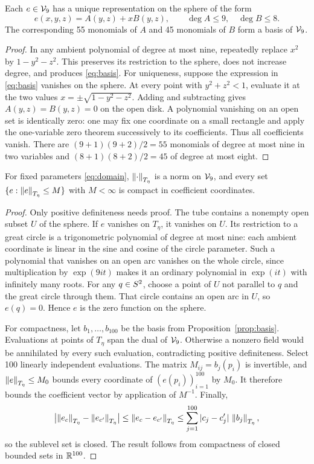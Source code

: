 \documentclass[11pt,a4paper]{article}
\begin{document}
\begin{proposition}\label{prop:basis}
Each $e\in\mathcal V_9$ has a unique representation on the sphere of the form
\begin{equation}\label{eq:basis}
 e(x,y,z)=A(y,z)+xB(y,z),\qquad \deg A\le9,\quad\deg B\le8.
\end{equation}
The corresponding 55 monomials of $A$ and 45 monomials of $B$ form a
basis of $\mathcal V_9$.
\end{proposition}
\begin{proof}
In any ambient polynomial of degree at most nine, repeatedly replace
$x^2$ by $1-y^2-z^2$. This preserves its restriction to the sphere,
does not increase degree, and produces \eqref{eq:basis}.
For uniqueness, suppose the expression in \eqref{eq:basis} vanishes
on the sphere. At every point with $y^2+z^2<1$, evaluate it at the two
values $x=\pm\sqrt{1-y^2-z^2}$. Adding and subtracting gives
$A(y,z)=B(y,z)=0$ on the open disk. A polynomial vanishing on an open
set is identically zero: one may fix one coordinate on a small rectangle
and apply the one-variable zero theorem successively to its coefficients.
Thus all coefficients vanish. There are
$(9+1)(9+2)/2=55$ monomials of degree at most nine in two variables and
$(8+1)(8+2)/2=45$ of degree at most eight.
\end{proof}

\begin{lemma}\label{lem:norm}
For fixed parameters \eqref{eq:domain}, $\left\lVert \cdot\right\rVert_{T_\eta}$ is a norm on
$\mathcal V_9$, and every set $\{e:\left\lVert e\right\rVert_{T_\eta}\le M\}$ with $M<\infty$ is
compact in coefficient coordinates.
\end{lemma}
\begin{proof}
Only positive definiteness needs proof. The tube contains a nonempty
open subset $U$ of the sphere. If $e$ vanishes on $T_\eta$, it vanishes
on $U$. Its restriction to a great circle is a trigonometric polynomial
of degree at most nine: each ambient coordinate is linear in the sine
and cosine of the circle parameter. Such a polynomial that vanishes on
an open arc vanishes on the whole circle, since multiplication by
$\exp(9it)$ makes it an ordinary polynomial in $\exp(it)$ with infinitely
many roots. For any $q\in S^2$, choose a point of $U$ not parallel to
$q$ and the great circle through them. That circle contains an open arc
in $U$, so $e(q)=0$. Hence $e$ is the zero function on the sphere.

For compactness, let $b_1,\ldots,b_{100}$ be the basis from
Proposition~\ref{prop:basis}. Evaluations at points of $T_\eta$ span
the dual of $\mathcal V_9$. Otherwise a nonzero field would be annihilated by
every such evaluation, contradicting positive definiteness. Select 100
linearly independent evaluations. The matrix
$M_{ij}=b_j(p_i)$ is invertible, and $\left\lVert e\right\rVert_{T_\eta}\le M_0$ bounds every
coordinate of $(e(p_i))_{i=1}^{100}$ by $M_0$. It therefore bounds the
coefficient vector by application of $M^{-1}$. Finally,
\[
 \bigl|\left\lVert e_c\right\rVert_{T_\eta}-\left\lVert e_{c'}\right\rVert_{T_\eta}\bigr|
 \le\left\lVert e_c-e_{c'}\right\rVert_{T_\eta}
 \le\sum_{j=1}^{100}|c_j-c'_j|\,\left\lVert b_j\right\rVert_{T_\eta},
\]
so the sublevel set is closed. The result follows from compactness of
closed bounded sets in $\mathbb R^{100}$.
\end{proof}
\end{document}
